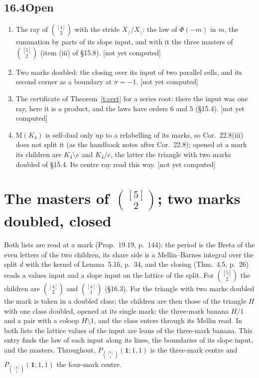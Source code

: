 \documentclass[11pt]{article}
\newcommand{\one}{\mathbf 1}
\newcommand{\Pth}{P_{\binom{[3]}1}(\one;1,1)}
\newcommand{\Pfour}{P_{\binom{[4]}1}(\one;1,1)}
\theoremstyle{plain}
\theoremstyle{definition}
\theoremstyle{remark}
\renewcommand{\thesection}{15}
\renewcommand{\theproposition}{15.\arabic{proposition}}
\newcommand{\notyet}{\textup{[not yet computed]}}
\begin{document}
\subsection*{16.4\quad Open}

\begin{enumerate}[label=(\roman*)]
\item The ray of $\binom{[4]}2$ with the stride $X_{/}/X_{\setminus}$: the law of $\Phi(-m)$ in $m$, the summation by parts of its slope input, and with it the three masters of $\binom{[5]}2$ (item (iii) of \S15.8). \notyet
\item Two marks doubled: the closing over its input of two parallel cells, and its second corner as a boundary at $\sigma=-1$. \notyet
\item The certificate of Theorem~\ref{t:cert} for a series root: there the input was one ray, here it is a product, and the laws have orders $6$ and $5$ (\S15.4). \notyet
\item $\mathrm M(K_4)$ is self-dual only up to a relabelling of its marks, so Cor.~22.8(iii) does not split it (as the handbook notes after Cor.~22.8); opened at a mark its children are $K_4\setminus e$ and $K_4/e$, the latter the triangle with two marks doubled of \S15.4. Its centre ray read this way. \notyet
\end{enumerate}


\renewcommand{\thesection}{17}
\setcounter{proposition}{0}
\renewcommand{\theproposition}{17.\arabic{proposition}}

\section{The masters of $\binom{[5]}2$; two marks doubled, closed}

Both lists are read at a mark (Prop.~19.19, p.~144): the period is the Breta of the even letters of the two children, its share side is a Mellin--Barnes integral over the split $d$ with the kernel of Lemma~5.16, p.~34, and the closing (Thm.~4.5, p.~26) reads a values input and a slope input on the lattice of the split. For $\binom{[5]}2$ the children are $\binom{[4]}2$ and $\binom{[4]}1$ (\S16.3). For the triangle with two marks doubled the mark is taken in a doubled class; the children are then those of the triangle $H$ with one class doubled, opened at its single mark: the three-mark banana $H/1$ and a pair with a coloop $H\setminus1$, and the class enters through its Mellin read. In both lists the lattice values of the input are leans of the three-mark banana. This entry finds the law of each input along its lines, the boundaries of its slope input, and the masters. Throughout, $\Pth$ is the three-mark centre and $\Pfour$ the four-mark centre.
\end{document}

